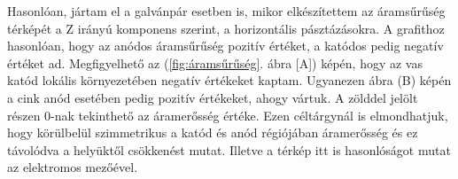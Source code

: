 Hasonlóan, jártam el a galvánpár esetben is, mikor elkészítettem az áramsűrűség térképét a Z irányú komponens szerint, a horizontális pásztázásokra. A grafithoz hasonlóan, hogy az anódos áramsűrűség pozitív értéket, a katódos pedig negatív értéket ad. Megfigyelhető az (\ref{fig:áramsűrűség}. ábra [A]) képén, hogy az vas katód lokális környezetében negatív értékeket kaptam. Ugyanezen ábra (B) képén a cink anód esetében pedig pozitív értékeket, ahogy vártuk. A zölddel jelölt részen 0-nak tekinthető az áramerősség értéke. Ezen céltárgynál is elmondhatjuk, hogy körülbelül szimmetrikus a katód és anód régiójában áramerősség és ez távolódva a helyüktől csökkenést mutat. Illetve a térkép itt is hasonlóságot mutat az elektromos mezőével.


